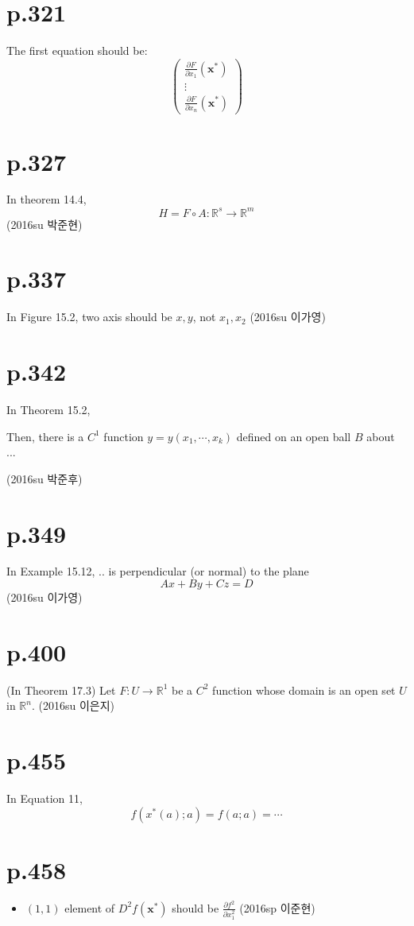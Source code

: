 \documentclass[a4paper]{article}
\begin{document}
\section{p.321}
The first equation should be: \[
\begin{pmatrix}
	\frac{\partial F}{\partial x_1}(\mathbf{x}^\ast)\\
	\vdots\\
	\frac{\partial F}{\partial x_n}(\mathbf{x}^\ast)
\end{pmatrix}
\]

\section{p.327} %
\label{sec:p_327}
In theorem 14.4,
\[
	H = F \circ A : \mathbb{R}^s \rightarrow \mathbb{R}^m
\]
(2016su 박준현)

\section{p.337} %
\label{sec:p_337}
In Figure 15.2, two axis should be $x,y$, not $x_1, x_2$ (2016su 이가영)

\section{p.342} %
\label{sec:p_342}
In Theorem 15.2,

Then, there is a $C^1$ function $y=y(x_1,\cdots,x_k)$ defined on an open ball $B$ about ...

(2016su 박준후)

\section{p.349} %
\label{sec:p_349}
In Example 15.12, .. is perpendicular (or normal) to the plane\[
	Ax+By+Cz=D
\](2016su 이가영)

\section{p.400} %
\label{sec:p_400}
(In Theorem 17.3) Let $F:U\rightarrow \mathbb{R}^1$ be a $C^2$ function whose domain is an open set $U$ in $\mathbb{R}^n$.
(2016su 이은지)

\section{p.455} %
\label{sec:p_455}
In Equation 11, \[
	f(x^\ast(a);a)=f(a;a)= \cdots
\]

\section{p.458} %
\label{sec:p_458}

\begin{itemize}
	\item $(1,1)$ element of $D^2 f(\mathbf{x^\ast})$ should be $\frac{\partial f^2}{\partial x_1^2}$ (2016sp 이준현)
\end{itemize}

\end{document}
